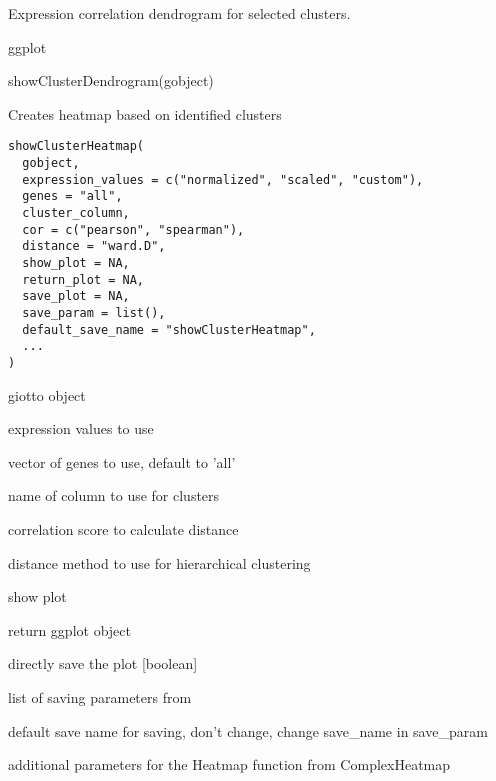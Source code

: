 \documentclass[a4paper]{book}
\begin{document}
%
\begin{Details}\relax
Expression correlation dendrogram for selected clusters.
\end{Details}
%
\begin{Value}
ggplot
\end{Value}
%
\begin{Examples}
\begin{ExampleCode}
    showClusterDendrogram(gobject)
\end{ExampleCode}
\end{Examples}
%
\begin{Description}\relax
Creates heatmap based on identified clusters
\end{Description}
%
\begin{Usage}
\begin{verbatim}
showClusterHeatmap(
  gobject,
  expression_values = c("normalized", "scaled", "custom"),
  genes = "all",
  cluster_column,
  cor = c("pearson", "spearman"),
  distance = "ward.D",
  show_plot = NA,
  return_plot = NA,
  save_plot = NA,
  save_param = list(),
  default_save_name = "showClusterHeatmap",
  ...
)
\end{verbatim}
\end{Usage}
%
\begin{Arguments}
\begin{ldescription}
\item[\code{gobject}] giotto object

\item[\code{expression\_values}] expression values to use

\item[\code{genes}] vector of genes to use, default to 'all'

\item[\code{cluster\_column}] name of column to use for clusters

\item[\code{cor}] correlation score to calculate distance

\item[\code{distance}] distance method to use for hierarchical clustering

\item[\code{show\_plot}] show plot

\item[\code{return\_plot}] return ggplot object

\item[\code{save\_plot}] directly save the plot [boolean]

\item[\code{save\_param}] list of saving parameters from 

\item[\code{default\_save\_name}] default save name for saving, don't change, change save\_name in save\_param

\item[\code{...}] additional parameters for the Heatmap function from ComplexHeatmap
\end{ldescription}
\end{Arguments}
\end{document}
